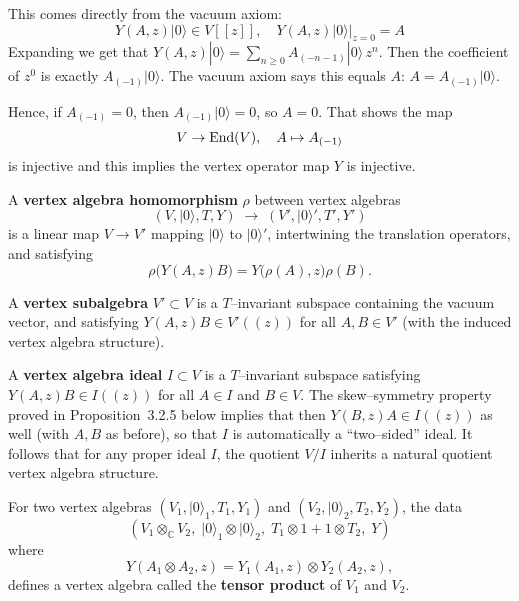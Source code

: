 \documentclass[12pt]{article}
\begin{document}
\begin{remark}[$Y$ is injective]
    This comes directly from the vacuum axiom:
\[Y(A,z)|0\rangle \in V[[z]], \quad Y(A,z)|0\rangle\big|_{z=0} = A\]
Expanding we get that $Y(A,z)|0\rangle = \sum_{n\ge 0} A_{(-n-1)}|0\rangle\,z^n$.
Then the coefficient of $z^0$ is exactly $A_{(-1)}|0\rangle$.
The vacuum axiom says this equals $A$:
$A = A_{(-1)}|0\rangle$.

Hence, if $A_{(-1)} = 0$, then $A_{(-1)}|0\rangle = 0$, so $A=0$.
That shows the map
\[
V \to \operatorname{End}(V), \quad A \mapsto A_{(-1)}
\]
is injective and this implies the vertex operator map $Y$ is injective.
\end{remark}

\begin{definition}
A \textbf{vertex algebra homomorphism} $\rho$ between vertex algebras
\[
(V, \lvert 0 \rangle, T, Y) \;\longrightarrow\; (V', \lvert 0 \rangle', T', Y')
\]
is a linear map $V \to V'$ mapping $\lvert 0 \rangle$ to $\lvert 0 \rangle'$, 
intertwining the translation operators, and satisfying
\[
\rho\big(Y(A,z)B\big) = Y\big(\rho(A),z\big)\rho(B).
\]

A \textbf{vertex subalgebra} $V' \subset V$ is a $T$–invariant subspace 
containing the vacuum vector, and satisfying 
$Y(A,z)B \in V'((z))$ for all $A,B \in V'$ 
(with the induced vertex algebra structure).

A \textbf{vertex algebra ideal} $I \subset V$ is a $T$–invariant subspace satisfying 
$Y(A,z)B \in I((z))$ for all $A \in I$ and $B \in V$.  
The skew–symmetry property proved in Proposition~3.2.5 below implies that then 
$Y(B,z)A \in I((z))$ as well (with $A,B$ as before), so that $I$ is automatically 
a ``two–sided'' ideal.  
It follows that for any proper ideal $I$, the quotient $V/I$ inherits 
a natural quotient vertex algebra structure.
\end{definition}
\begin{definition}
For two vertex algebras $(V_1, \lvert 0 \rangle_1, T_1, Y_1)$ 
and $(V_2, \lvert 0 \rangle_2, T_2, Y_2)$, 
the data
\[
(V_1 \otimes_{\mathbb{C}} V_2,\;
 \lvert 0 \rangle_1 \otimes \lvert 0 \rangle_2,\;
 T_1 \otimes 1 + 1 \otimes T_2,\;
 Y)
\]
where
\[
Y(A_1 \otimes A_2, z) 
= Y_1(A_1,z) \otimes Y_2(A_2,z),
\]
defines a vertex algebra called the \textbf{tensor product} 
of $V_1$ and $V_2$.
\end{definition}
\end{document}
